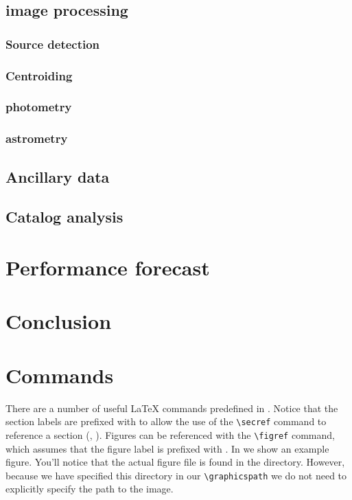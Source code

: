 \documentclass[\docopts]{\docclass}
\begin{document}
\subsection{image processing}
\label{sec:processing}

\subsubsection{Source detection}
\label{sec:detection}

\subsubsection{Centroiding}
\label{sec:centroiding}

\subsubsection{photometry}
\label{sec:photometry}

\subsubsection{astrometry}
\label{sec:astrometry}

\subsection{Ancillary data}
\label{sec:ancillary}


\subsection{Catalog analysis}
\label{sec:analysis}


\section{Performance forecast}
\label{sec:forecast}


\section{Conclusion}
\label{sec:conclusion}


\section{Commands}
\label{sec:commands}

There are a number of useful \LaTeX\xspace commands predefined in .
Notice that the section labels are prefixed with  to allow the use of the \verb=\secref= command to reference a section (\ie, ).
Figures can be referenced with the \verb=\figref= command, which assumes that the figure label is prefixed with .
In  we show an example figure.
You'll notice that the actual figure file is found in the  directory.
However, because we have specified this directory in our \verb=\graphicspath= we do not need to explicitly specify the path to the image.
\end{document}
